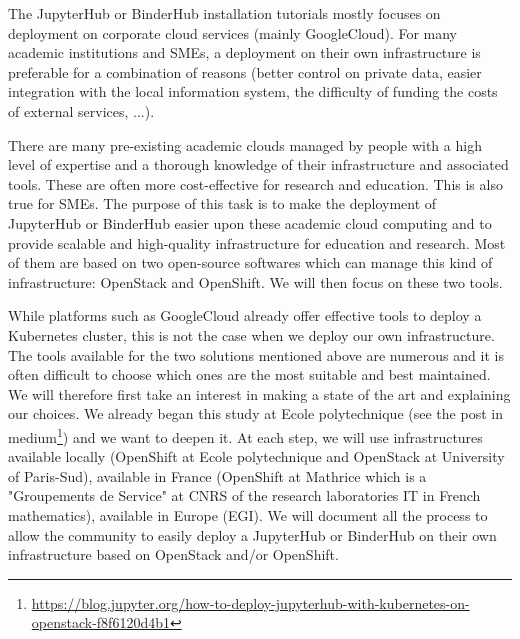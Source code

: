 \begin{task}[
  title=Easy deployment of JupyterHub and BinderHub on a variety of
  infrastructure,
  id=jh-bh-deployment,
  lead=EP,
  PM=11PM, %
  wphases={0-18}, %
  partners={EP,UPSUD}] %

  The JupyterHub or BinderHub installation tutorials mostly focuses on
  deployment on corporate cloud services (mainly GoogleCloud). For many academic
  institutions and SMEs, a deployment on their own infrastructure is preferable
  for a combination of reasons (better control on private data, easier
  integration with the local information system, the difficulty of funding the
  costs of external services, ...).

  There are many pre-existing academic clouds managed by people with a high
  level of expertise and a thorough knowledge of their infrastructure and
  associated tools. These are often more cost-effective for research and
  education. This is also true for SMEs. The purpose of this task is to make the
  deployment of JupyterHub or BinderHub easier upon these academic cloud
  computing and to provide scalable and high-quality infrastructure for
  education and research. Most of them are based on two open-source softwares
  which can manage this kind of infrastructure: OpenStack and OpenShift. We will
  then focus on these two tools.
  
  While platforms such as GoogleCloud already offer effective tools to deploy a
  Kubernetes cluster, this is not the case when we deploy our own
  infrastructure. The tools available for the two solutions mentioned above are
  numerous and it is often difficult to choose which ones are the most suitable
  and best maintained. We will therefore first take an interest in making a
  state of the art and explaining our choices. We already began this study at
  Ecole polytechnique (see the post in
  medium\footnote{\url{https://blog.jupyter.org/how-to-deploy-jupyterhub-with-kubernetes-on-openstack-f8f6120d4b1}})
  and we want to deepen it. At each step, we will use infrastructures available
  locally (OpenShift at Ecole polytechnique and OpenStack at University of
  Paris-Sud), available in France (OpenShift at Mathrice which is a "Groupements
  de Service" at CNRS of the research laboratories IT in French mathematics),
  available in Europe (EGI). We will document all the process to allow the
  community to easily deploy a JupyterHub or BinderHub on their own
  infrastructure based on OpenStack and/or OpenShift.


\end{task}
